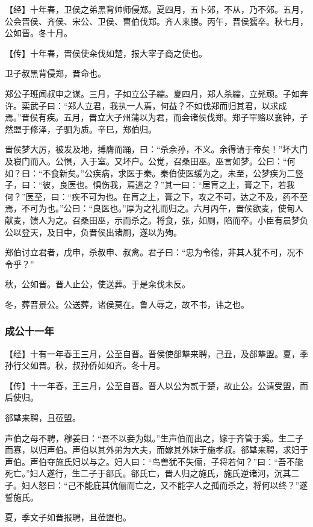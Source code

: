 \documentclass[]{article}
\begin{document}
【经】十年春，卫侯之弟黑背帅师侵郑。夏四月，五卜郊，不从，乃不郊。五月，公会晋侯、齐侯、宋公、卫侯、曹伯伐郑。齐人来媵。丙午，晋侯獳卒。秋七月，公如晋。冬十月。

【传】十年春，晋侯使籴伐如楚，报大宰子商之使也。

卫子叔黑背侵郑，晋命也。

郑公子班闻叔申之谋。三月，子如立公子繻。夏四月，郑人杀繻，立髡顽。子如奔许。栾武子曰：``郑人立君，我执一人焉，何益？不如伐郑而归其君，以求成焉。''晋侯有疾。五月，晋立大子州蒲以为君，而会诸侯伐郑。郑子罕赂以襄钟，子然盟于修泽，子驷为质。辛巳，郑伯归。

晋侯梦大厉，被发及地，搏膺而踊，曰：``杀余孙，不义。余得请于帝矣！''坏大门及寝门而入。公惧，入于室。又坏户。公觉，召桑田巫。巫言如梦。公曰：``何如？曰：``不食新矣。''公疾病，求医于秦。秦伯使医缓为之。未至，公梦疾为二竖子，曰：``彼，良医也。惧伤我，焉逃之？''其一曰：``居肓之上，膏之下，若我何？''医至，曰：``疾不可为也。在肓之上，膏之下，攻之不可，达之不及，药不至焉，不可为也。''公曰：``良医也。''厚为之礼而归之。六月丙午，晋侯欲麦，使甸人献麦，馈人为之。召桑田巫，示而杀之。将食，张，如厕，陷而卒。小臣有晨梦负公以登天，及日中，负晋侯出诸厕，遂以为殉。

郑伯讨立君者，戊申，杀叔申、叔禽。君子曰：``忠为令德，非其人犹不可，况不令乎？''

秋，公如晋。晋人止公，使送葬。于是籴伐未反。

冬，葬晋景公。公送葬，诸侯莫在。鲁人辱之，故不书，讳之也。

\hypertarget{header-n1670}{%
\subsubsection{成公十一年}\label{header-n1670}}

【经】十有一年春王三月，公至自晋。晋侯使郤犨来聘，己丑，及郤犨盟。夏，季孙行父如晋。秋，叔孙侨如如齐。冬十月。

【传】十一年春，王三月，公至自晋。晋人以公为贰于楚，故止公。公请受盟，而后使归。

郤犨来聘，且莅盟。

声伯之母不聘，穆姜曰：``吾不以妾为姒。''生声伯而出之，嫁于齐管于奚。生二子而寡，以归声伯。声伯以其外弟为大夫，而嫁其外妹于施孝叔。郤犨来聘，求妇于声伯。声伯夺施氏妇以与之。妇人曰：``鸟兽犹不失俪，子将若何？''曰：``吾不能死亡。''妇人遂行，生二子于郤氏。郤氏亡，晋人归之施氏，施氏逆诸河，沉其二子。妇人怒曰：``己不能庇其伉俪而亡之，又不能字人之孤而杀之，将何以终？''遂誓施氏。

夏，季文子如晋报聘，且莅盟也。
\end{document}
